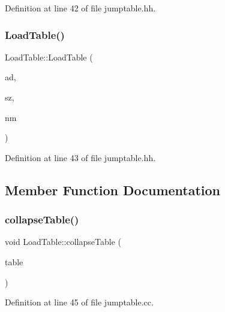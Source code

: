 Definition at line 42 of file jumptable.\+hh.

\mbox{\label{class_load_table_a24244df0afb9f3426100031ddca944dd}} 
\subsubsection{\texorpdfstring{LoadTable()}{LoadTable()}\hspace{0.1cm}{\footnotesize\ttfamily [3/3]}}
{\footnotesize\ttfamily Load\+Table\+::\+Load\+Table (\begin{DoxyParamCaption}\item[{const \mbox{\hyperlink{class_address}{Address}} \&}]{ad,  }\item[{int4}]{sz,  }\item[{int4}]{nm }\end{DoxyParamCaption})\hspace{0.3cm}{\ttfamily [inline]}}



Definition at line 43 of file jumptable.\+hh.



\subsection{Member Function Documentation}
\mbox{\label{class_load_table_a97a6c0e7bdf847535b4117aff4e49ede}} 
\subsubsection{\texorpdfstring{collapseTable()}{collapseTable()}}
{\footnotesize\ttfamily void Load\+Table\+::collapse\+Table (\begin{DoxyParamCaption}\item[{vector$<$ \mbox{\hyperlink{class_load_table}{Load\+Table}} $>$ \&}]{table }\end{DoxyParamCaption})\hspace{0.3cm}{\ttfamily [static]}}



Definition at line 45 of file jumptable.\+cc.

